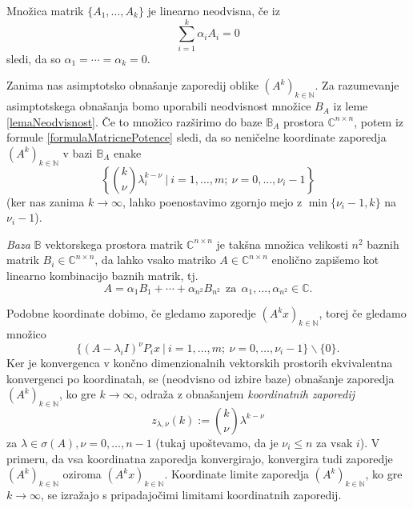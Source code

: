 \documentclass[mat1]{fmfdelo}
\newcommand{\N}{\mathbb N}
\newcommand{\C}{\mathbb C}
\begin{document}
\begin{opomba}
    Množica matrik $\{A_1, \ldots, A_k\}$ je linearno neodvisna, če iz
    \begin{equation*}
        \sum_{i=1}^k \alpha_i A_i = 0
    \end{equation*}
    sledi, da so $\alpha_1 = \cdots = \alpha_k = 0$.
\end{opomba}
Zanima nas asimptotsko obnašanje zaporedij oblike $(A^k)_{k\in\N}$. Za razumevanje asimptotskega obnašanja bomo uporabili neodvisnost množice $B_A$ iz leme \ref{lemaNeodvisnost}. Če to množico razširimo do baze $\mathbb{B}_A$ prostora $\C^{n \times n}$, potem iz formule \eqref{formulaMatricnePotence} sledi, da so neničelne koordinate zaporedja $(A^k)_{k\in\N}$ v bazi $\mathbb{B}_A$ enake
\begin{equation*}
    \left\{{k \choose \nu} \lambda_i^{k-\nu}\ |\ i = 1, \ldots, m;\ \nu = 0, \ldots, \nu_i-1\right\}
\end{equation*}
(ker nas zanima $k \rightarrow \infty$, lahko poenostavimo zgornjo mejo z $\min\{\nu_i-1, k\}$ na $\nu_i - 1$).
\begin{opomba}
    \emph{Baza} $\mathbb{B}$ vektorskega prostora matrik $\C^{n\times n}$ je takšna množica velikosti $n^2$ baznih matrik $B_i \in \C^{n\times n}$, da lahko vsako matriko $A \in \C^{n\times n}$ enolično zapišemo kot linearno kombinacijo baznih matrik, tj.\ \[A = \alpha_1 B_1 + \cdots + \alpha_{n^2} B_{n^2}\ \ \text{za}\ \ \alpha_1, \ldots, \alpha_{n^2} \in \C.\]
\end{opomba}
Podobne koordinate dobimo, če gledamo zaporedje $(A^k x)_{k\in\N}$, torej če gledamo množico
\begin{equation*}
    \{(A-\lambda_i I)^{\nu} P_i x\ |\ i = 1, \ldots, m;\ \nu = 0, \ldots, \nu_i - 1\} \backslash \{0\}.
\end{equation*}
Ker je konvergenca v končno dimenzionalnih vektorskih prostorih ekvivalentna konvergenci po koordinatah, se (neodvisno od izbire baze) obnašanje zaporedja $(A^k)_{k\in\N}$, ko gre $k \rightarrow \infty$, odraža z obnašanjem \emph{koordinatnih zaporedij}
\begin{equation*}
    z_{\lambda, \nu} (k) := {k \choose \nu} \lambda^{k - \nu}
\end{equation*}
za $\lambda \in \sigma(A), \nu = 0, \ldots, n-1$  (tukaj upoštevamo, da je $\nu_i \leq n$ za vsak $i$). V primeru, da vsa koordinatna zaporedja konvergirajo, konvergira tudi zaporedje $(A^k)_{k\in\N}$ oziroma $(A^k x)_{k\in\N}$. Koordinate limite zaporedja $(A^k)_{k\in\N}$, ko gre $k \rightarrow \infty$, se izražajo s pripadajočimi limitami koordinatnih zaporedij.
\end{document}
